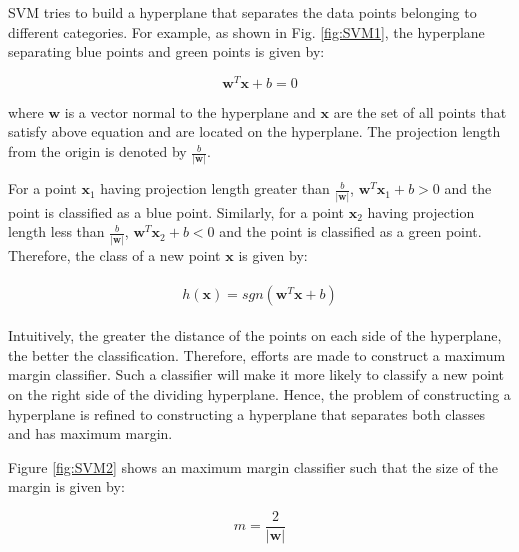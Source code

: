 %


SVM tries to build a hyperplane that separates the data points belonging to different categories. For example, as shown in Fig. \ref{fig:SVM1}, the hyperplane separating blue points and green points is given by:

$$
\mathbf{w}^{T}\mathbf{x} + b = 0
$$

where $\mathbf{w}$ is a vector normal to the hyperplane and $\mathbf{x}$ are the set of all points that satisfy above equation and are located on the hyperplane. The projection length from the origin is denoted by $\frac{b}{|\mathbf{w}|}$.

For a point $\mathbf{x}_1$ having projection length greater than $\frac{b}{|\mathbf{w}|}$, $\mathbf{w}^{T}\mathbf{x}_1 + b > 0$ and the point is classified as a blue point. Similarly, for a point $\mathbf{x}_2$ having projection length less than $\frac{b}{|\mathbf{w}|}$, $\mathbf{w}^{T}\mathbf{x}_2 + b < 0$ and the point is classified as a green point. Therefore, the class of a new point $\mathbf{x}$ is given by:

\begin{align}
\begin{aligned}
h(\mathbf{x}) = sgn(\mathbf{w}^{T}\mathbf{x} + b) \label{eq:sgn}
\end{aligned}
\end{align}

Intuitively, the greater the distance of the points on each side of the hyperplane, the better the classification. Therefore, efforts are made to construct a maximum margin classifier.  Such a classifier will make it more likely to classify a new point on the right side of the dividing hyperplane. Hence, the problem of constructing a hyperplane is refined to constructing a hyperplane that separates both classes and has maximum margin.

Figure \ref{fig:SVM2} shows an maximum margin classifier such that the size of the margin is given by:

$$
m=\frac{2}{|\mathbf{w}|}
$$

